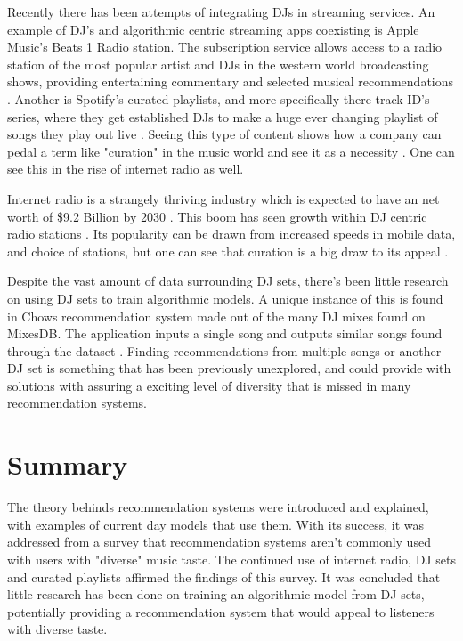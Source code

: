 Recently there has been attempts of integrating DJs in streaming services.  An example of DJ's and algorithmic centric streaming apps coexisting is Apple Music's Beats 1 Radio station. The subscription service allows access to a radio station of the most popular artist and DJs in the western world broadcasting shows, providing entertaining commentary and selected musical recommendations \citep{dms_apple_2020}. Another is Spotify's curated playlists, and more specifically there track ID's series, where they get established DJs to make a huge ever changing playlist of songs they play out live \citep{spotify_introducing_2020}.  Seeing this type of content shows how a company can pedal a term like "curation" in the music world and see it as a necessity \citep{barna_perfect_2017}. One can see this in the rise of internet radio as well.  

Internet radio is a strangely thriving industry which is expected to have an net worth of \$9.2 Billion by 2030 \citep{market_research_future_internet_2022}. This boom has seen growth within DJ centric radio stations \citep{gillett_how_2021}. Its popularity can be drawn from increased speeds in mobile data, and choice of stations, but one can see that curation is a big draw to its appeal \citep{nts_2023}.

Despite the vast amount of data surrounding DJ sets, there's been little research on using DJ sets to train algorithmic models. A unique instance of this is found in Chows recommendation system made out of the many DJ mixes found on MixesDB. The application inputs a single song and outputs similar songs found through the dataset \citep{chow_music_2020}. Finding recommendations from multiple songs or another DJ set is something that has been previously unexplored, and could provide with solutions with assuring a exciting level of diversity that is missed in many recommendation systems.


\section{Summary}
The theory behinds recommendation systems were introduced and explained, with examples of current day models that use them. With its success, it was addressed from a survey that recommendation systems aren't commonly used with users with "diverse" music taste. The continued use of internet radio, DJ sets and curated playlists affirmed the findings of this survey. It was concluded that little research has been done on training an algorithmic model from DJ sets, potentially providing a recommendation system that would appeal to listeners with diverse taste. 

